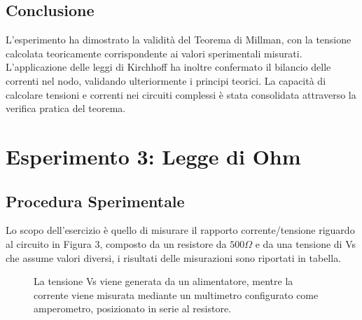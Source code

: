 \subsection{Conclusione}
L’esperimento ha dimostrato la validità del Teorema di Millman, con la tensione calcolata teoricamente corrispondente ai valori sperimentali misurati. L’applicazione delle leggi di Kirchhoff ha inoltre confermato il bilancio delle correnti nel nodo, validando ulteriormente i principi teorici. La capacità di calcolare tensioni e correnti nei circuiti complessi è stata consolidata attraverso la verifica pratica del teorema.

\section{Esperimento 3: Legge di Ohm}
\subsection{Procedura Sperimentale}
Lo scopo dell’esercizio è quello di misurare il rapporto corrente/tensione riguardo al circuito in Figura 3, composto da un resistore da $500\Omega$ e da una tensione di Vs che assume valori diversi, i risultati delle misurazioni sono riportati in tabella.
\begin{figure}[h]
\begin{minipage}[t]{0.5\textwidth} %
\vspace{0pt}
    \raggedright %
    La tensione Vs viene generata da un alimentatore, mentre la corrente viene misurata mediante un multimetro configurato come amperometro, posizionato in serie al resistore. 
\end{minipage}%
\hspace{0.05\textwidth} %
\begin{minipage}[t]{0.15\textwidth} %
\vspace{0pt}
    \centering
    \caption{}
    \label{fig:circuito}
\end{minipage}
\end{figure} 
\newpage

